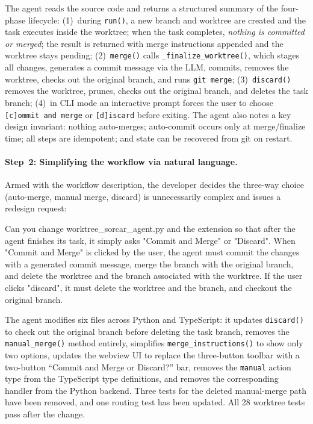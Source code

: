 \documentclass{article}
\begin{document}
\noindent The agent reads the source code and returns a structured summary of the four-phase lifecycle: (1)~during \texttt{run()}, a new branch and worktree are created and the task executes inside the worktree; when the task completes, \emph{nothing is committed or merged}; the result is returned with merge instructions appended and the worktree stays pending; (2)~\texttt{merge()} calls \texttt{\_finalize\_worktree()}, which stages all changes, generates a commit message via the LLM, commits, removes the worktree, checks out the original branch, and runs \texttt{git merge}; (3)~\texttt{discard()} removes the worktree, prunes, checks out the original branch, and deletes the task branch; (4)~in CLI mode an interactive prompt forces the user to choose \texttt{[c]ommit and merge} or \texttt{[d]iscard} before exiting. The agent also notes a key design invariant: nothing auto-merges; auto-commit occurs only at merge/finalize time; all steps are idempotent; and state can be recovered from git on restart.

\paragraph{Step~2: Simplifying the workflow via natural language.} Armed with the workflow description, the developer decides the three-way choice (auto-merge, manual merge, discard) is unnecessarily complex and issues a redesign request:

\begin{prompt}
Can you change worktree_sorcar_agent.py and the extension so that after the agent 
finishes its task, it simply asks "Commit and Merge" or "Discard". When "Commit 
and Merge" is clicked by the user, the agent must commit the changes with a 
generated commit message, merge the branch with the original branch, and delete 
the worktree and the branch associated with the worktree. If the user clicks 
"discard", it must delete the worktree and the branch, and checkout the 
original branch.
\end{prompt}

\noindent The agent modifies six files across Python and TypeScript: it updates \texttt{discard()} to check out the original branch before deleting the task branch, removes the \texttt{manual\_merge()} method entirely, simplifies \texttt{merge\_instructions()} to show only two options, updates the webview UI to replace the three-button toolbar with a two-button ``Commit and Merge or Discard?'' bar, removes the \texttt{manual} action type from the TypeScript type definitions, and removes the corresponding handler from the Python backend.  Three tests for the deleted manual-merge path have been removed, and one routing test has been updated. All 28 worktree tests pass after the change.
\end{document}
